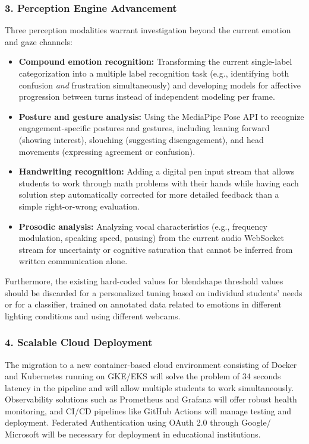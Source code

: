 \documentclass[conference, letterpaper]{IEEEtran}
\begin{document}
\subsubsection*{3. Perception Engine Advancement}

Three perception modalities warrant investigation beyond the current emotion and gaze channels:

\begin{itemize}[nosep]

    \item \textbf{Compound emotion recognition:} Transforming the current single-label categorization into a multiple label recognition task (e.g., identifying both confusion \emph{and} frustration simultaneously) and developing models for affective progression between turns instead of independent modeling per frame.

    \item \textbf{Posture and gesture analysis:} Using the MediaPipe Pose API to recognize engagement-specific postures and gestures, including leaning forward (showing interest), slouching (suggesting disengagement), and head movements (expressing agreement or confusion).

    \item \textbf{Handwriting recognition:} Adding a digital pen input stream that allows students to work through math problems with their hands while having each solution step automatically corrected for more detailed feedback than a simple right-or-wrong evaluation.

    \item \textbf{Prosodic analysis:} Analyzing vocal characteristics (e.g., frequency modulation, speaking speed, pausing) from the current audio WebSocket stream for uncertainty or cognitive saturation that cannot be inferred from written communication alone.
\end{itemize}

Furthermore, the existing hard-coded values for blendshape threshold values should be discarded for a personalized tuning based on individual students’ needs or for a classifier, trained on annotated data related to emotions in different lighting conditions and using different webcams.

\subsubsection*{4. Scalable Cloud Deployment}

The migration to a new container-based cloud environment consisting of Docker and Kubernetes running on GKE/EKS will solve the problem of 34 seconds latency in the pipeline and will allow multiple students to work simultaneously. Observability solutions such as Prometheus and Grafana will offer robust health monitoring, and CI/CD pipelines like GitHub Actions will manage testing and deployment. Federated Authentication using OAuth 2.0 through Google/ \\Microsoft will be necessary for deployment in educational institutions.
\end{document}
